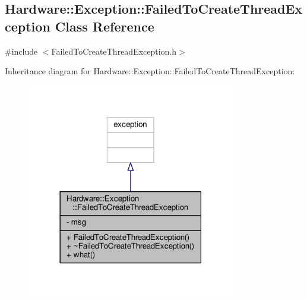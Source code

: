 \hypertarget{class_hardware_1_1_exception_1_1_failed_to_create_thread_exception}{}\subsection{Hardware\+:\+:Exception\+:\+:Failed\+To\+Create\+Thread\+Exception Class Reference}
\label{class_hardware_1_1_exception_1_1_failed_to_create_thread_exception}


{\ttfamily \#include $<$Failed\+To\+Create\+Thread\+Exception.\+h$>$}



Inheritance diagram for Hardware\+:\+:Exception\+:\+:Failed\+To\+Create\+Thread\+Exception\+:
\nopagebreak
\begin{figure}[H]
\begin{center}
\leavevmode
\includegraphics[width=258pt]{class_hardware_1_1_exception_1_1_failed_to_create_thread_exception__inherit__graph}
\end{center}
\end{figure}


